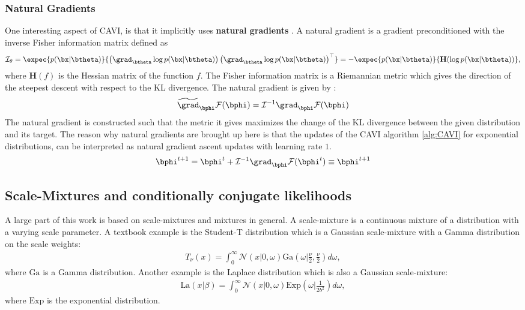 \subsubsection{Natural Gradients}

One interesting aspect of \ac{CAVI}, is that it implicitly uses \textbf{natural gradients} \cite{amariNaturalGradientWorks1998}.
A natural gradient is a gradient preconditioned with the inverse Fisher information matrix defined as
\begin{align}
    \mathcal{I}_\theta = \expec{p(\bx|\btheta)}{\left(\grad_{\btheta}\log p(\bx|\btheta)\right)\left(\grad_{\btheta} \log p(\bx|\btheta)\right)^\top} = -\expec{p(\bx|\btheta)}{\mathbf{H}(\log p(\bx|\btheta))},
    \label{eq:fisherinfomatrix}
\end{align}
where $\mathbf{H}(f)$ is the Hessian matrix of the function $f$.
The Fisher information matrix is a Riemannian metric which gives the direction of the steepest descent with respect to the KL divergence.
The natural gradient is given by :
\begin{align*}
    \widetilde{\grad}_{\bphi}\mathcal{F}(\bphi) = \mathcal{I}^{-1} \grad_{\bphi}\mathcal{F}(\bphi)
\end{align*}
The natural gradient is constructed such that the metric it gives maximizes the change of the \ac{KL} divergence between the given distribution and its target.
The reason why natural gradients are brought up here is that the updates of the \ac{CAVI} algorithm \ref{alg:CAVI} for exponential distributions, can be interpreted as natural gradient ascent updates with learning rate $1$.
\begin{align*}
    \bphi^{t+1} = \bphi^t + \mathcal{I}^{-1}\grad_{\bphi}\mathcal{F}(\bphi^t) \equiv \bphi^{t+1}
\end{align*}


\subsection{Scale-Mixtures and conditionally conjugate likelihoods}
\label{sec:scale-mixtures}
A large part of this work is based on scale-mixtures and mixtures in general.
A scale-mixture is a continuous mixture of a distribution with a varying scale parameter.
A textbook example is the Student-T distribution which is a Gaussian scale-mixture with a Gamma distribution on the scale weights:
\begin{align*}
    T_\nu(x) = \int_{0}^\infty \mathcal{N}\left(x|0,\omega\right)\mathrm{Ga}\left(\omega|\frac{\nu}{2}, \frac{\nu}{2}\right)d\omega,
\end{align*}
where $\mathrm{Ga}$ is a Gamma distribution.
Another example is the Laplace distribution which is also a Gaussian scale-mixture:
\begin{align*}
    \mathrm{La}(x|\beta) = \int_0^{\infty} \mathcal{N}(x|0,\omega)\mathrm{Exp}\left(\omega|\frac{1}{2b^2}\right)d\omega,
\end{align*}
where $\mathrm{Exp}$ is the exponential distribution.

